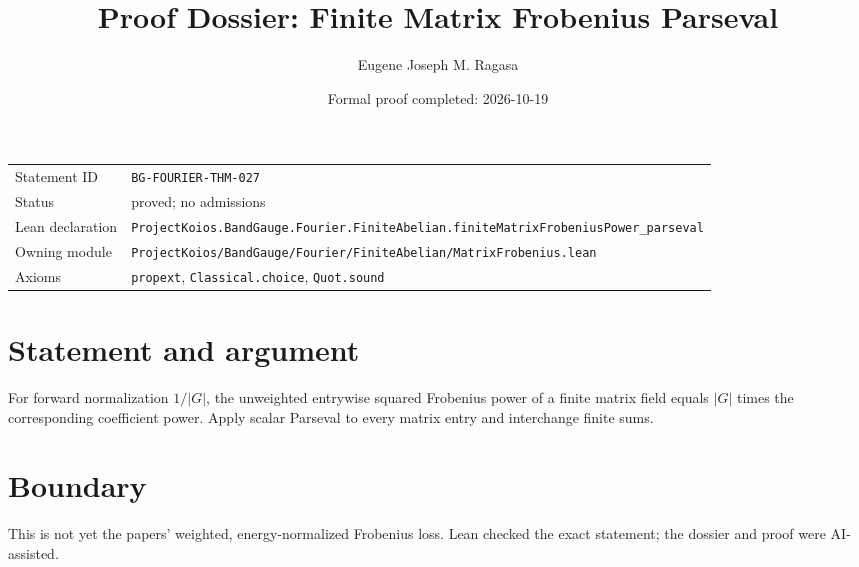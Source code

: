 \documentclass[11pt]{article}
\title{Proof Dossier: Finite Matrix Frobenius Parseval}
\author{Eugene Joseph M. Ragasa}
\date{Formal proof completed: 2026-10-19}
\begin{document}
\maketitle
\noindent\begin{tabularx}{\textwidth}{@{}lX@{}}\toprule
Statement ID & \texttt{BG-FOURIER-THM-027} \\
Status & proved; no admissions \\
Lean declaration & \texttt{ProjectKoios.BandGauge.Fourier.FiniteAbelian.}\newline\texttt{finiteMatrixFrobeniusPower\_parseval} \\
Owning module & \texttt{ProjectKoios/BandGauge/Fourier/FiniteAbelian/MatrixFrobenius.lean} \\
Axioms & \texttt{propext}, \texttt{Classical.choice}, \texttt{Quot.sound} \\
\bottomrule\end{tabularx}
\section{Statement and argument}
For forward normalization $1/|G|$, the unweighted entrywise squared Frobenius power of a finite matrix field equals $|G|$ times the corresponding coefficient power. Apply scalar Parseval to every matrix entry and interchange finite sums.
\section{Boundary}
This is not yet the papers' weighted, energy-normalized Frobenius loss. Lean checked the exact statement; the dossier and proof were AI-assisted.
\end{document}
